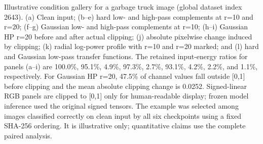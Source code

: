 Illustrative condition gallery for a garbage truck image (global dataset index 2643). (a) Clean input; (b–e) hard low- and high-pass complements at r=10 and r=20; (f–g) Gaussian low- and high-pass complements at r=10; (h–i) Gaussian HP r=20 before and after actual clipping; (j) absolute pixelwise change induced by clipping; (k) radial log-power profile with r=10 and r=20 marked; and (l) hard and Gaussian low-pass transfer functions. The retained input-energy ratios for panels (a–i) are 100.0\%, 95.1\%, 4.9\%, 97.3\%, 2.7\%, 93.1\%, 4.2\%, 2.2\%, and 1.1\%, respectively. For Gaussian HP r=20, 47.5\% of channel values fall outside [0,1] before clipping and the mean absolute clipping change is 0.0252. Signed-linear RGB panels are clipped to [0,1] only for human-readable display; frozen model inference used the original signed tensors. The example was selected among images classified correctly on clean input by all six checkpoints using a fixed SHA-256 ordering. It is illustrative only; quantitative claims use the complete paired analysis.